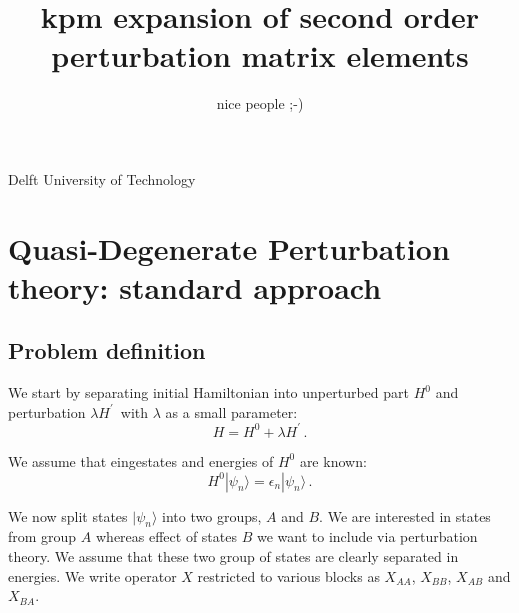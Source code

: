 \documentclass[10pt, onecolumn, aps, prb, superscriptaddress, floatfix, showpacs, notitlepage]{revtex4-1}
\newcommand{\ket}[1]{|#1\rangle}
\begin{document}
\author{nice people ;-)}
\affiliation
{Delft University of Technology}

\title{kpm expansion of second order perturbation matrix elements}

\maketitle

\section{Quasi-Degenerate Perturbation theory: standard approach}

\subsection{Problem definition}

We start by separating initial Hamiltonian into unperturbed part $H^0$ and perturbation $\lambda H^{\prime}\,$ with $\lambda$ as a small parameter:
\begin{equation}
H = H^{0} + \lambda H^{\prime} \,.
\end{equation}

We assume that eingestates and energies of $H^{0}$ are known:
\begin{equation}
H^0 \ket{\psi_n} = \epsilon_n \ket{\psi_n} \,.
\end{equation}

We now split states $\ket{\psi_n}$ into two groups, $A$ and $B$.
We are interested in states from group $A$ whereas effect of states $B$ we want to include via perturbation theory.
We assume that these two group of states are clearly separated in energies.
We write operator $X$ restricted to various blocks as $X_{AA}$, $X_{BB}$, $X_{AB}$ and $X_{BA}$.
\end{document}
